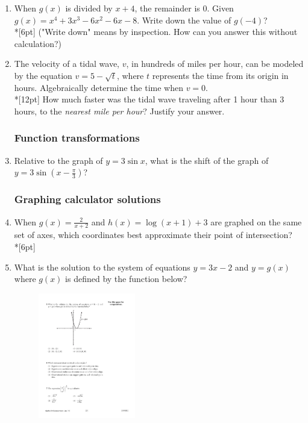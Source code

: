 \documentclass[12pt, oneside]{article}
\begin{document}
\begin{enumerate}
\item When $g(x)$ is divided by $x+4$, the remainder is 0. Given $g(x)=x^4+3x^3- 6x^2- 6x-8$. Write down the value of $g(-4)$?\\*[6pt]
("Write down" means by inspection. How can you answer this without calculation?)

\item The velocity of a tidal wave, $v$, in hundreds of miles per hour, can be modeled by the equation $v= 5-\sqrt{t}$, where $t$ represents the time from its origin in hours. Algebraically determine the time when $v=0$.\\*[12pt]
How much faster was the tidal wave traveling after 1 hour than 3 hours, to the \textit{nearest mile per hour}? Justify your answer.


\subsubsection*{Function transformations}
\item Relative to the graph of $y=3 \sin x$, what is the shift of the graph of $y=3 \sin {\left(x- \frac{\pi}{3}\right)}$?

\subsubsection*{Graphing calculator solutions}
\item When $\displaystyle g(x)=\frac{2}{x+2}$ and $h(x)= \log (x+1)+3$ are graphed on the same set of axes, which coordinates best approximate their point of intersection?\\*[6pt]

\item What is the solution to the system of equations $y=3x-2$ and $y=g(x)$ where $g(x)$ is defined by the function below?

\begin{figure}[!ht]
    \centering
    \includegraphics[width=0.4\textwidth]{parabola-graphic.pdf}
\end{figure}



\end{enumerate}
\end{document}
